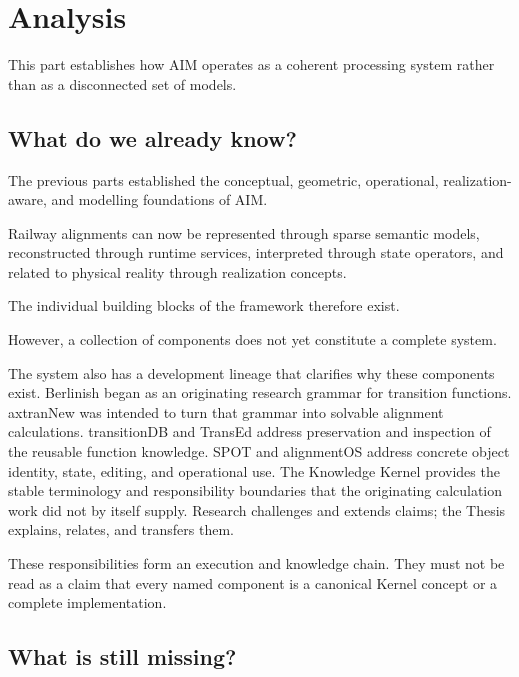 
\chapter*{Analysis}
{}

This part establishes how AIM operates as a coherent processing system
rather than as a disconnected set of models.

\section*{What do we already know?}

The previous parts established the conceptual, geometric, operational,
realization-aware, and modelling foundations of AIM.

Railway alignments can now be represented through sparse semantic
models, reconstructed through runtime services, interpreted through
state operators, and related to physical reality through realization
concepts.

The individual building blocks of the framework therefore exist.

However, a collection of components does not yet constitute a complete
system.

The system also has a development lineage that clarifies why these components
exist. Berlinish began as an originating research grammar for transition
functions. axtranNew was intended to turn that grammar into solvable alignment
calculations. transitionDB and TransEd address preservation and inspection of
the reusable function knowledge. SPOT and alignmentOS address concrete object
identity, state, editing, and operational use. The Knowledge Kernel provides
the stable terminology and responsibility boundaries that the originating
calculation work did not by itself supply. Research challenges and extends
claims; the Thesis explains, relates, and transfers them.

These responsibilities form an execution and knowledge chain. They must not be
read as a claim that every named component is a canonical Kernel concept or a
complete implementation.

\section*{What is still missing?}

